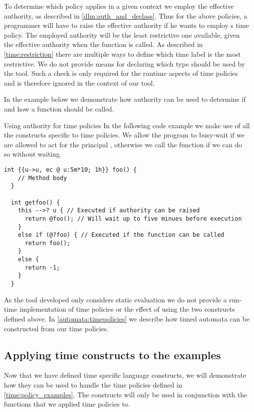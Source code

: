 To determine which policy applies in a given context we employ the effective authority, as described in \cref{dlm:auth_and_declass}.
Thus for the above policies, a programmer will have to raise the effective authority if he wants to employ s time policy.
The employed authority will be the least restrictive one available, given the effective authority when the function is called.
As described in \cref{time:restriction} there are multiple ways to define which time label is the most restrictive.
We do not provide means for declaring which type should be used by the tool.
Such a check is only required for the runtime aspects of time policies and is therefore ignored in the context of our tool.

In the example below we demonstrate how authority can be used to determine if and how a function should be called.

\begin{minipage}{\linewidth}
\begin{example}{Using authority for time policies}\label{time:complexcall}
In the following code example we make use of all the constructs specific to time policies.
We allow the program to busy-wait if we are allowed to act for the principal , otherwise we call the function  if we can do so without waiting.
\begin{lstlisting}[style=dlmc]
  int {{u->u, ec @ u:5m*10; 1h}} foo() {
    // Method body
  }

  int getfoo() {
    this -->? u { // Executed if authority can be raised
      return @foo(); // Will wait up to five minues before execution
    }
    else if (@?foo) { // Executed if the function can be called
      return foo();
    }
    else {
      return -1;
    }
  }
\end{lstlisting}
\end{example}
\end{minipage}

As the tool developed only considers static evaluation we do not provide a run-time implementation of time policies or the effect of using the two constructs defined above.
In \cref{automata:timepolicies} we describe how timed automata can be constructed from our time policies.

\subsection{Applying time constructs to the examples}\label{time:construct_examples}
Now that we have defined time specific language constructs, we will demonstrate how they can be used to handle the time policies defined in \cref{time:policy_examples}.
The constructs will only be used in conjunction with the functions that we applied time policies to.

